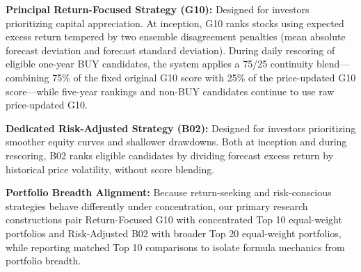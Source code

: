 \documentclass[11pt,a4paper]{article}
\numberwithin{table}{section}
\begin{document}
\textbf{Principal Return-Focused Strategy (G10):}  Designed for investors prioritizing capital appreciation. At inception, G10 ranks stocks using expected excess return tempered by two ensemble disagreement penalties (mean absolute forecast deviation and forecast standard deviation). During daily rescoring of eligible one-year BUY candidates, the system applies a 75/25 continuity blend---combining 75\% of the fixed original G10 score with 25\% of the price-updated G10 score---while five-year rankings and non-BUY candidates continue to use raw price-updated G10.

\textbf{Dedicated Risk-Adjusted Strategy (B02):}  Designed for investors prioritizing smoother equity curves and shallower drawdowns. Both at inception and during rescoring, B02 ranks eligible candidates by dividing forecast excess return by historical price volatility, without score blending.

\textbf{Portfolio Breadth Alignment:}  Because return-seeking and risk-conscious strategies behave differently under concentration, our primary research constructions pair Return-Focused G10 with concentrated Top 10 equal-weight portfolios and Risk-Adjusted B02 with broader Top 20 equal-weight portfolios, while reporting matched Top 10 comparisons to isolate formula mechanics from portfolio breadth.
\end{document}
